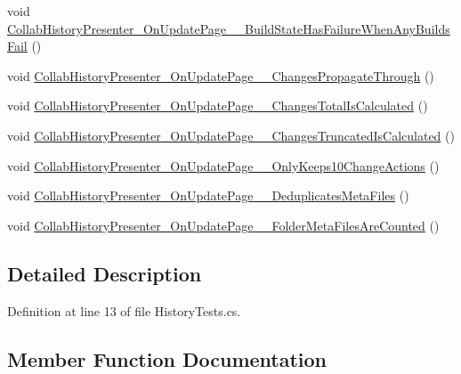 \begin{DoxyCompactItemize}
\item 
void \mbox{\hyperlink{class_unity_editor_1_1_collaboration_1_1_tests_1_1_history_tests_a7bf2c380605f29dcf8fff3115811e5cb}{Collab\+History\+Presenter\+\_\+\+On\+Update\+Page\+\_\+\+\_\+\+Build\+State\+Has\+Failure\+When\+Any\+Builds\+Fail}} ()
\item 
void \mbox{\hyperlink{class_unity_editor_1_1_collaboration_1_1_tests_1_1_history_tests_a4cc2ab377806fa6cfa7638af1812f7cc}{Collab\+History\+Presenter\+\_\+\+On\+Update\+Page\+\_\+\+\_\+\+Changes\+Propagate\+Through}} ()
\item 
void \mbox{\hyperlink{class_unity_editor_1_1_collaboration_1_1_tests_1_1_history_tests_af2028a6ba98d82e85f6b962b64da622d}{Collab\+History\+Presenter\+\_\+\+On\+Update\+Page\+\_\+\+\_\+\+Changes\+Total\+Is\+Calculated}} ()
\item 
void \mbox{\hyperlink{class_unity_editor_1_1_collaboration_1_1_tests_1_1_history_tests_afcabd7d56da250264d80aabf26550215}{Collab\+History\+Presenter\+\_\+\+On\+Update\+Page\+\_\+\+\_\+\+Changes\+Truncated\+Is\+Calculated}} ()
\item 
void \mbox{\hyperlink{class_unity_editor_1_1_collaboration_1_1_tests_1_1_history_tests_a4160b10c4f882df867a025203d77a436}{Collab\+History\+Presenter\+\_\+\+On\+Update\+Page\+\_\+\+\_\+\+Only\+Keeps10\+Change\+Actions}} ()
\item 
void \mbox{\hyperlink{class_unity_editor_1_1_collaboration_1_1_tests_1_1_history_tests_aab0ba7f3e423697efc70b74702a10d33}{Collab\+History\+Presenter\+\_\+\+On\+Update\+Page\+\_\+\+\_\+\+Deduplicates\+Meta\+Files}} ()
\item 
void \mbox{\hyperlink{class_unity_editor_1_1_collaboration_1_1_tests_1_1_history_tests_a24ea0a346ee19796cf0cccce57411b42}{Collab\+History\+Presenter\+\_\+\+On\+Update\+Page\+\_\+\+\_\+\+Folder\+Meta\+Files\+Are\+Counted}} ()
\end{DoxyCompactItemize}


\subsection{Detailed Description}


Definition at line 13 of file History\+Tests.\+cs.



\subsection{Member Function Documentation}
\mbox{\label{class_unity_editor_1_1_collaboration_1_1_tests_1_1_history_tests_aaa14bb16d5257c0e68545c49c0826539}} 
